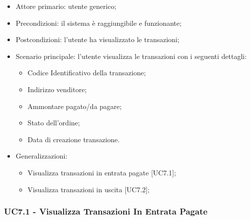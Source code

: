 \begin{itemize}
    \item Attore primario: utente generico;
    \item Precondizioni: il sistema è raggiungibile e funzionante;
    \item Postcondizioni: l'utente ha visualizzato le transazioni;
    \item Scenario principale: l'utente visualizza le transazioni con i seguenti dettagli:
        \begin{itemize}
            \item Codice Identificativo della transazione;
            \item Indirizzo venditore;
            \item Ammontare pagato/da pagare;
            \item Stato dell'ordine;
            \item Data di creazione transazione.
        \end{itemize}
    \item Generalizzazioni:
        \begin{itemize}
            \item Visualizza transazioni in entrata pagate [UC7.1];
            \item Visualizza transazioni in uscita [UC7.2];
        \end{itemize}
\end{itemize}

\subsubsection{UC7.1 - Visualizza Transazioni In Entrata Pagate}

